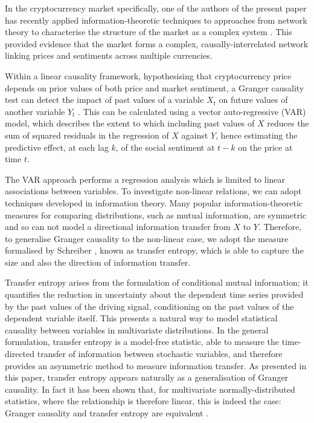 \documentclass[]{rsos}%
\begin{document}
  In the cryptocurrency market specifically, one of the authors of the present paper has recently applied information-theoretic techniques to approaches from network theory to characterise the structure of the market as a complex system \cite{Aste2019}. This provided evidence that the market forms a complex, causally-interrelated network linking prices and sentiments across multiple currencies.

  Within a linear causality framework, hypothesising that cryptocurrency price depends on prior values of both price and market sentiment, a Granger causality test can detect the impact of past values of a variable $X_t$ on future values of another variable $Y_t$ \cite{granger1969investigating}. This can be calculated using a vector auto-regressive (VAR) model, which describes the extent to which including past values of $X$ reduces the sum of squared residuals in the regression of $X$ against $Y$, hence estimating the predictive effect, at each lag $k$, of the social sentiment at $t-k$ on the price at time $t$. 

  The VAR approach performs a regression analysis which is limited to linear associations between variables. To investigate non-linear relations, we can adopt techniques developed in information theory. Many popular information-theoretic measures for comparing distributions, such as mutual information, are symmetric and so can not model a directional information transfer from $X$ to $Y$. Therefore, to generalise Granger causality to the non-linear case, we adopt the measure formalised by Schreiber \cite{schreiber2000measuring}, known as transfer entropy, which is able to capture the size and also the direction of information transfer.

  Transfer entropy arises from the formulation of conditional mutual information; it quantifies the reduction in uncertainty about the dependent time series provided by the past values of the driving signal, conditioning on the past values of the dependent variable itself. This presents a natural way to model statistical causality between variables in multivariate distributions. In the general formulation, transfer entropy is a model-free statistic, able to measure the time-directed transfer of information between stochastic variables, and therefore provides an asymmetric method to measure information transfer. As presented in this paper, transfer entropy appears naturally as a generalisation of Granger causality. In fact it has been shown that, for multivariate normally-distributed statistics, where the relationship is therefore linear, this is indeed the case: Granger causality and transfer entropy are equivalent \cite{barnett2009granger}.
\end{document}
